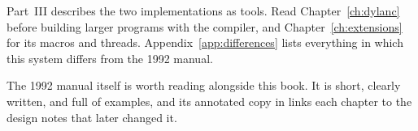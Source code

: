 Part~III describes the two implementations as tools. Read
Chapter~\ref{ch:dylanc} before building larger programs with the compiler,
and Chapter~\ref{ch:extensions} for its macros and threads.
Appendix~\ref{app:differences} lists everything in which this system
differs from the 1992 manual.

The 1992 manual itself is worth reading alongside this book. It is short,
clearly written, and full of examples, and its annotated copy in
 links each chapter to the design notes that
later changed it.
